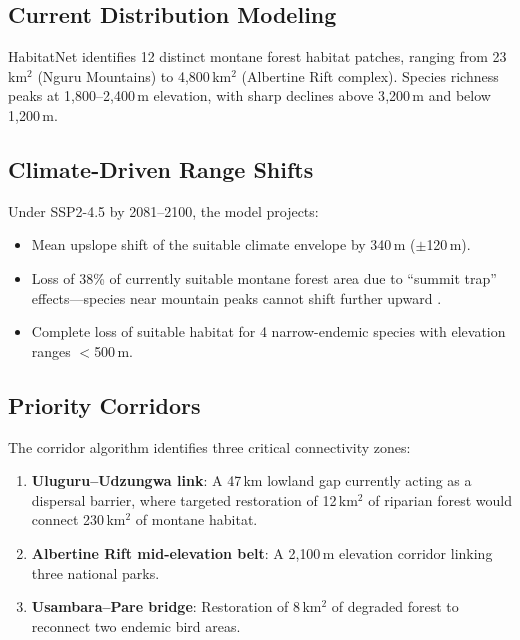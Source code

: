 \documentclass[11pt,a4paper]{article}
\begin{document}
\subsection{Current Distribution Modeling}

HabitatNet identifies 12 distinct montane forest habitat patches, ranging
from 23\,km$^2$ (Nguru Mountains) to 4{,}800\,km$^2$ (Albertine Rift
complex). Species richness peaks at 1{,}800--2{,}400\,m elevation, with
sharp declines above 3{,}200\,m and below 1{,}200\,m.

\subsection{Climate-Driven Range Shifts}

Under SSP2-4.5 by 2081--2100, the model projects:
\begin{itemize}
  \item Mean upslope shift of the suitable climate envelope by
    340\,m ($\pm$120\,m).
  \item Loss of 38\% of currently suitable montane forest area due to
    ``summit trap'' effects---species near mountain peaks cannot
    shift further upward \citep{freeman2018climate}.
  \item Complete loss of suitable habitat for 4 narrow-endemic species
    with elevation ranges $<$500\,m.
\end{itemize}

\subsection{Priority Corridors}

The corridor algorithm identifies three critical connectivity zones:
\begin{enumerate}
  \item \textbf{Uluguru--Udzungwa link}: A 47\,km lowland gap currently
    acting as a dispersal barrier, where targeted restoration of 12\,km$^2$
    of riparian forest would connect 230\,km$^2$ of montane habitat.
  \item \textbf{Albertine Rift mid-elevation belt}: A 2{,}100\,m
    elevation corridor linking three national parks.
  \item \textbf{Usambara--Pare bridge}: Restoration of 8\,km$^2$ of
    degraded forest to reconnect two endemic bird areas.
\end{enumerate}


\end{document}

